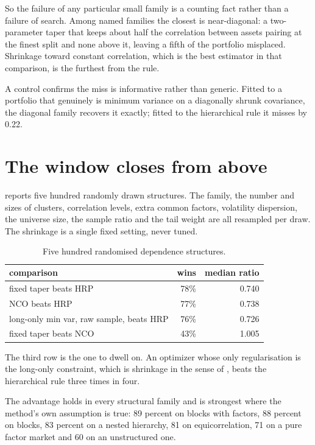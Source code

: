 \documentclass[11pt]{article}
\begin{document}
So the failure of any particular small family is a counting fact rather than
a failure of search. Among named families the closest is near-diagonal: a
two-parameter taper that keeps about half the correlation between assets
pairing at the finest split and none above it, leaving a fifth of the
portfolio misplaced. Shrinkage toward constant correlation, which is the best
estimator in that comparison, is the furthest from the rule.

A control confirms the miss is informative rather than generic. Fitted to a
portfolio that genuinely is minimum variance on a diagonally shrunk
covariance, the diagonal family recovers it exactly; fitted to the
hierarchical rule it misses by 0.22.

\section{The window closes from above}

 reports five hundred randomly drawn structures. The family,
the number and sizes of clusters, correlation levels, extra common factors,
volatility dispersion, the universe size, the sample ratio and the tail
weight are all resampled per draw. The shrinkage is a single fixed setting,
never tuned.

\begin{table}[ht]
\centering
\small
\begin{tabular}{lrr}
\toprule
comparison & wins & median ratio \\
\midrule
fixed taper beats HRP & 78\% & 0.740 \\
NCO beats HRP & 77\% & 0.738 \\
long-only min var, raw sample, beats HRP & 76\% & 0.726 \\
fixed taper beats NCO & 43\% & 1.005 \\
\bottomrule
\end{tabular}
\caption{Five hundred randomised dependence structures.}
\label{tab:robust}
\end{table}

The third row is the one to dwell on. An optimizer whose only regularisation
is the long-only constraint, which is shrinkage in the sense of
\textcite{jagannathanma2003}, beats the hierarchical rule three times in four.

The advantage holds in every structural family and is strongest where the
method's own assumption is true: 89 percent on blocks with factors, 88
percent on blocks, 83 percent on a nested hierarchy, 81 on equicorrelation,
71 on a pure factor market and 60 on an unstructured one.
\end{document}
